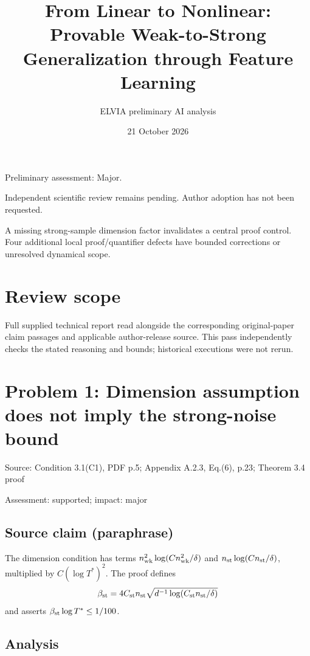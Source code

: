 \documentclass[11pt]{article}
\begin{document}
\title{From Linear to Nonlinear: Provable Weak-to-Strong Generalization through Feature Learning}

\author{ELVIA preliminary AI analysis}\date{21 October 2026}\maketitle

Preliminary assessment: Major.\par

Independent scientific review remains pending. Author adoption has not been requested.

A missing strong-sample dimension factor invalidates a central proof control. Four additional local proof/quantifier defects have bounded corrections or unresolved dynamical scope.

\section*{Review scope}

Full supplied technical report read alongside the corresponding original-paper claim passages and applicable author-release source. This pass independently checks the stated reasoning and bounds; historical executions were not rerun.

\section*{Problem 1: Dimension assumption does not imply the strong-noise bound}

Source: Condition 3.1(C1), PDF p.5; Appendix A.2.3, Eq.(6), p.23; Theorem 3.4 proof

Assessment: supported; impact: major

\subsection*{Source claim (paraphrase)}

The dimension condition has terms \(n_{\rm wk}^2\log(Cn_{\rm wk}^2/\delta)\) and \(n_{\rm st}\log(Cn_{\rm st}/\delta)\), multiplied by \(C(\log T^*)^2\). The proof defines \[\beta_{\rm st}=4C_{\rm st}n_{\rm st}\sqrt{d^{-1}\log(C_{\rm st}n_{\rm st}/\delta)}\] and asserts \(\beta_{\rm st}\log T^*\leq1/100\).

\subsection*{Analysis}
\end{document}
